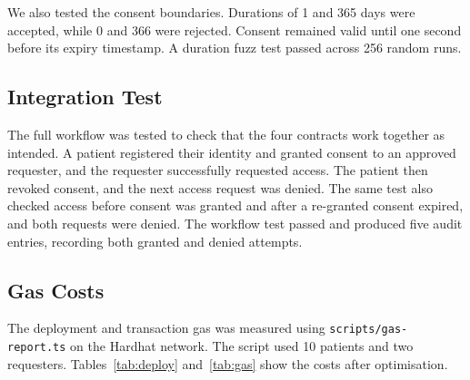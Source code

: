 \documentclass[10pt,a4paper]{article}
\begin{document}
We also tested the consent boundaries. Durations of 1 and 365 days were accepted, while 0 and 366 were rejected. Consent remained valid until one second before its expiry timestamp. A duration fuzz test passed across 256 random runs.

\subsection{Integration Test}

The full workflow was tested to check that the four contracts work together as intended. A patient registered their identity and granted consent to an approved requester, and the requester successfully requested access. The patient then revoked consent, and the next access request was denied. The same test also checked access before consent was granted and after a re-granted consent expired, and both requests were denied. The workflow test passed and produced five audit entries, recording both granted and denied attempts.

\subsection{Gas Costs}

The deployment and transaction gas was measured using \texttt{scripts/gas-report.ts} on the Hardhat network. The script used 10 patients and two requesters. Tables~\ref{tab:deploy} and~\ref{tab:gas} show the costs after optimisation.
\end{document}
